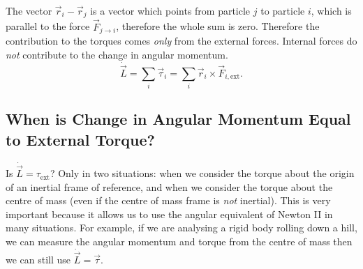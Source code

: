 \documentclass[../classical_mechanics.tex]{subfiles}
\begin{document}
        The vector $\vec{r}_i-\vec{r}_j$ is a vector which points from particle $j$ to particle $i$, which is parallel to the force $\vec{F}_{j\to i}$, therefore the whole sum is zero.
        Therefore the contribution to the torques comes \textit{only} from the external forces.
        Internal forces do \textit{not} contribute to the change in angular momentum.
        \begin{equation}
            \dot{\vec{L}}=\sum_i\vec{\tau}_i=\sum_i\vec{r}_i\times\vec{F}_{i,\text{ext}}.
        \end{equation}

        \subsection{When is Change in Angular Momentum Equal to External Torque?}\label{subsec:when-is-change-in-angular-momentum-equal-to-external-force}
            Is $\dot{\vec{L}}=\tau_\text{ext}$?
            Only in two situations: when we consider the torque about the origin of an inertial frame of reference, and when we consider the torque about the centre of mass (even if the centre of mass frame is \textit{not} inertial).
            This is very important because it allows us to use the angular equivalent of Newton II in many situations.
            For example, if we are analysing a rigid body rolling down a hill, we can measure the angular momentum and torque from the centre of mass then we can still use $\dot{\vec{L}}=\vec{\tau}$.
\end{document}
